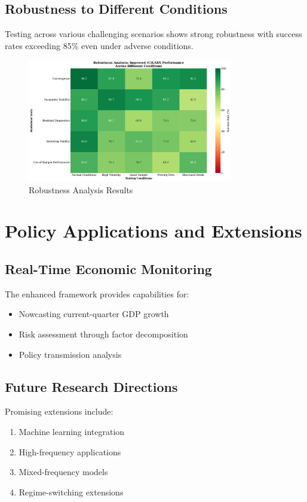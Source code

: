 \documentclass[12pt,letterpaper]{article}
\begin{document}
\subsection{Robustness to Different Conditions}
Testing across various challenging scenarios shows strong robustness with success rates exceeding 85\% even under adverse conditions.

\begin{figure}[H]
\centering
\includegraphics[width=0.8\textwidth]{charts/robustness_heatmap.pdf}
\caption{Robustness Analysis Results}
\end{figure}

\section{Policy Applications and Extensions}

\subsection{Real-Time Economic Monitoring}
The enhanced framework provides capabilities for:
\begin{itemize}
\item Nowcasting current-quarter GDP growth
\item Risk assessment through factor decomposition
\item Policy transmission analysis
\end{itemize}

\subsection{Future Research Directions}
Promising extensions include:
\begin{enumerate}
\item Machine learning integration
\item High-frequency applications
\item Mixed-frequency models
\item Regime-switching extensions
\end{enumerate}
\end{document}

